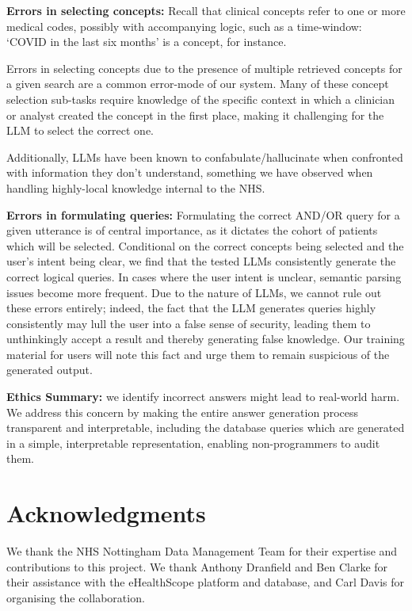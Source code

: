 \documentclass[11pt]{article}
\begin{document}
\textbf{Errors in selecting concepts:}
Recall that clinical concepts refer to one or more medical codes, possibly with accompanying logic, such as a time-window: `COVID in the last six months' is a concept, for instance.

Errors in selecting concepts due to the presence of multiple retrieved concepts for a given search are a common error-mode of our system. Many of these concept selection sub-tasks require knowledge of the specific context in which a clinician or analyst created the concept in the first place, making it challenging for the LLM to select the correct one.

Additionally, LLMs have been known to confabulate/hallucinate when confronted with information they don't understand, something we have observed when handling highly-local knowledge internal to the NHS.

\textbf{Errors in formulating queries:}
Formulating the correct AND/OR query for a given utterance is of central importance, as it dictates the cohort of patients which will be selected.
Conditional on the correct concepts being selected and the user's intent being clear, we find that the tested LLMs consistently generate the correct logical queries.
In cases where the user intent is unclear, semantic parsing issues become more frequent. Due to the nature of LLMs, we cannot rule out these errors entirely; indeed, the fact that the LLM generates queries highly consistently may lull the user into a false sense of security, leading them to unthinkingly accept a result and thereby generating false knowledge. Our training material for users will note this fact and urge them to remain suspicious of the generated output.

\textbf{Ethics Summary:} we identify incorrect answers might lead to real-world harm. We address this concern by making the entire answer generation process transparent and interpretable, including the database queries which are generated in a simple, interpretable representation, enabling non-programmers to audit them.


\section*{Acknowledgments}
We thank the NHS Nottingham Data Management Team for their expertise and contributions to this project. We thank Anthony Dranfield and Ben Clarke for their assistance with the eHealthScope platform and database, and Carl Davis for organising the collaboration.



\appendix

\end{document}
